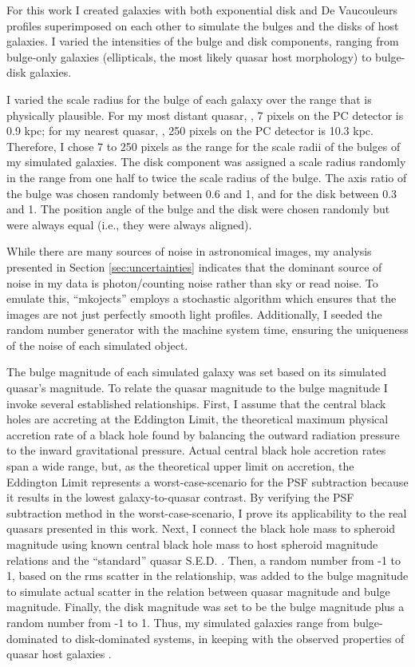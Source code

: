 For this work I created galaxies with both exponential disk and De Vaucouleurs profiles superimposed on each other to simulate the bulges and the disks of host galaxies. I varied the intensities of the bulge and disk components, ranging from bulge-only galaxies (ellipticals, the most likely quasar host morphology) to bulge-disk galaxies.

I varied the scale radius for the bulge of each galaxy over the range that is physically plausible. For my most distant quasar, , 7 pixels on the PC detector is 0.9 kpc; for my nearest quasar, , 250 pixels on the PC detector is 10.3 kpc. Therefore, I chose 7 to 250 pixels as the range for the scale radii of the bulges of my simulated galaxies. The disk component was assigned a scale radius randomly in the range from one half to twice the scale radius of the bulge. The axis ratio of the bulge was chosen randomly between 0.6 and 1, and for the disk between 0.3 and 1. The position angle of the bulge and the disk were chosen randomly but were always equal (i.e., they were always aligned).

While there are many sources of noise in astronomical images, my analysis presented in Section \ref{sec:uncertainties} indicates that the dominant source of noise in my data is photon/counting noise rather than sky or read noise. To emulate this, ``mkojects'' employs a stochastic algorithm which ensures that the images are not just perfectly smooth light profiles. Additionally, I seeded the random number generator with the machine system time, ensuring the uniqueness of the noise of each simulated object.

The bulge magnitude of each simulated galaxy was set based on its simulated quasar's magnitude. To relate the quasar magnitude to the bulge magnitude I invoke several established relationships. First, I assume that the central black holes are accreting at the Eddington Limit, the theoretical maximum physical accretion rate of a black hole found by balancing the outward radiation pressure to the inward gravitational pressure.  Actual central black hole accretion rates span a wide range, but, as the theoretical upper limit on accretion, the Eddington Limit represents a worst-case-scenario for the PSF subtraction because it results in the lowest galaxy-to-quasar contrast.  By verifying the PSF subtraction method in the worst-case-scenario, I prove its applicability to the real quasars presented in this work.  Next, I connect the black hole mass to spheroid magnitude using known central black hole mass to host spheroid magnitude relations \citep{Bettoni} and the ``standard'' quasar S.E.D. \citep{Elvis}. Then, a random number from -1 to 1, based on the rms scatter in the \cite{Bettoni} relationship,  was added to the bulge magnitude to simulate actual scatter in the relation between quasar magnitude and bulge magnitude. Finally, the disk magnitude was set to be the bulge magnitude plus a random number from -1 to 1. Thus, my simulated galaxies range from bulge-dominated to disk-dominated systems, in keeping with the observed properties of quasar host galaxies \citep{Guyon,McLeod}.

